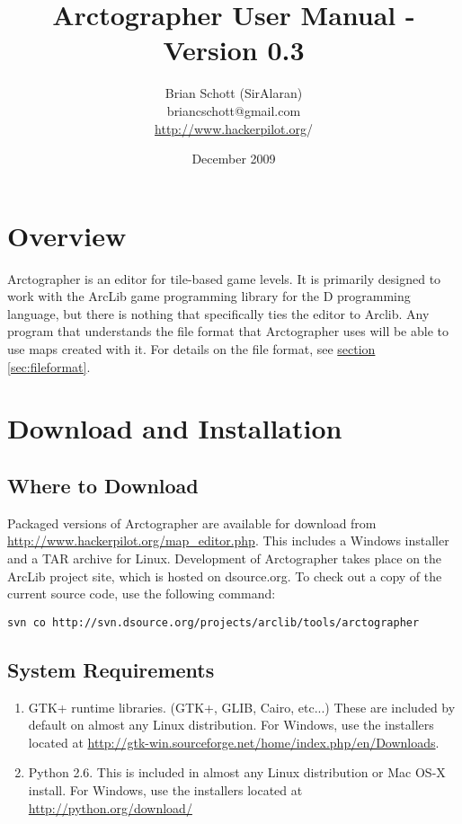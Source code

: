 \documentclass[12pt,letterpaper]{article}
\begin{document}
\title{Arctographer User Manual - Version 0.3}
\author{Brian Schott (SirAlaran)\\
briancschott@gmail.com\\
\url{http://www.hackerpilot.org}/}
\date{December 2009}
\maketitle

\tableofcontents

\section{Overview}
Arctographer is an editor for tile-based game levels. It is primarily designed
to work with the ArcLib game programming library for the D programming language,
but there is nothing that specifically ties the editor to Arclib. Any program
that understands the file format that Arctographer uses will be able to use maps
created with it. For details on the file format, see
\hyperref[sec:fileformat]{section \ref{sec:fileformat}}.

\section{Download and Installation}
\subsection{Where to Download}
Packaged versions of Arctographer are available for download from
\url{http://www.hackerpilot.org/map_editor.php}. This includes a Windows
installer and a TAR archive for Linux. Development of Arctographer takes place
on the ArcLib project site, which is hosted on dsource.org. To check out a copy
of the current source code, use the following command: \begin{verbatim}
svn co http://svn.dsource.org/projects/arclib/tools/arctographer
\end{verbatim}
\subsection{System Requirements}
\begin{enumerate}
	\item GTK+ runtime libraries. (GTK+, GLIB, Cairo, etc...) These are included
		by default on almost any Linux distribution. For Windows, use the
		installers located at
		\url{http://gtk-win.sourceforge.net/home/index.php/en/Downloads}.
	\item Python 2.6. This is included in almost any Linux distribution or Mac
		OS-X install. For Windows, use the installers located at
		\url{http://python.org/download/}
\end{enumerate}
\end{document}
